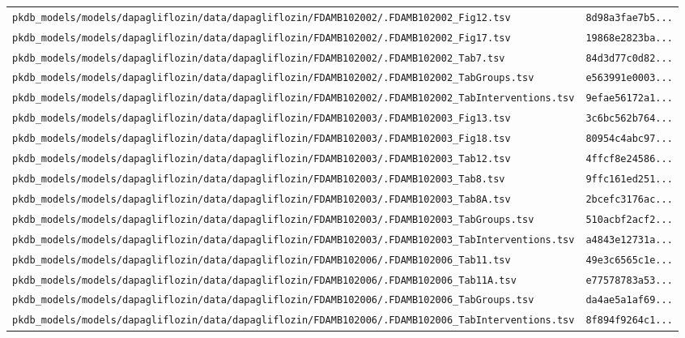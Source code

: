 \documentclass{article}
\begin{document}
\begin{longtable}{ll}
\texttt{pkdb\_models/models/dapagliflozin/data/dapagliflozin/FDAMB102002/.FDAMB102002\_Fig12.tsv} & \texttt{8d98a3fae7b5...} \\
\texttt{pkdb\_models/models/dapagliflozin/data/dapagliflozin/FDAMB102002/.FDAMB102002\_Fig17.tsv} & \texttt{19868e2823ba...} \\
\texttt{pkdb\_models/models/dapagliflozin/data/dapagliflozin/FDAMB102002/.FDAMB102002\_Tab7.tsv} & \texttt{84d3d77c0d82...} \\
\texttt{pkdb\_models/models/dapagliflozin/data/dapagliflozin/FDAMB102002/.FDAMB102002\_TabGroups.tsv} & \texttt{e563991e0003...} \\
\texttt{pkdb\_models/models/dapagliflozin/data/dapagliflozin/FDAMB102002/.FDAMB102002\_TabInterventions.tsv} & \texttt{9efae56172a1...} \\
\texttt{pkdb\_models/models/dapagliflozin/data/dapagliflozin/FDAMB102003/.FDAMB102003\_Fig13.tsv} & \texttt{3c6bc562b764...} \\
\texttt{pkdb\_models/models/dapagliflozin/data/dapagliflozin/FDAMB102003/.FDAMB102003\_Fig18.tsv} & \texttt{80954c4abc97...} \\
\texttt{pkdb\_models/models/dapagliflozin/data/dapagliflozin/FDAMB102003/.FDAMB102003\_Tab12.tsv} & \texttt{4ffcf8e24586...} \\
\texttt{pkdb\_models/models/dapagliflozin/data/dapagliflozin/FDAMB102003/.FDAMB102003\_Tab8.tsv} & \texttt{9ffc161ed251...} \\
\texttt{pkdb\_models/models/dapagliflozin/data/dapagliflozin/FDAMB102003/.FDAMB102003\_Tab8A.tsv} & \texttt{2bcefc3176ac...} \\
\texttt{pkdb\_models/models/dapagliflozin/data/dapagliflozin/FDAMB102003/.FDAMB102003\_TabGroups.tsv} & \texttt{510acbf2acf2...} \\
\texttt{pkdb\_models/models/dapagliflozin/data/dapagliflozin/FDAMB102003/.FDAMB102003\_TabInterventions.tsv} & \texttt{a4843e12731a...} \\
\texttt{pkdb\_models/models/dapagliflozin/data/dapagliflozin/FDAMB102006/.FDAMB102006\_Tab11.tsv} & \texttt{49e3c6565c1e...} \\
\texttt{pkdb\_models/models/dapagliflozin/data/dapagliflozin/FDAMB102006/.FDAMB102006\_Tab11A.tsv} & \texttt{e77578783a53...} \\
\texttt{pkdb\_models/models/dapagliflozin/data/dapagliflozin/FDAMB102006/.FDAMB102006\_TabGroups.tsv} & \texttt{da4ae5a1af69...} \\
\texttt{pkdb\_models/models/dapagliflozin/data/dapagliflozin/FDAMB102006/.FDAMB102006\_TabInterventions.tsv} & \texttt{8f894f9264c1...} \\

\end{longtable}
\end{document}
